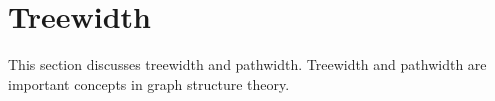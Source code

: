 \section{Treewidth}\label{chap:treewidth}
This section discusses treewidth and pathwidth. Treewidth and pathwidth are important concepts in graph structure theory.


